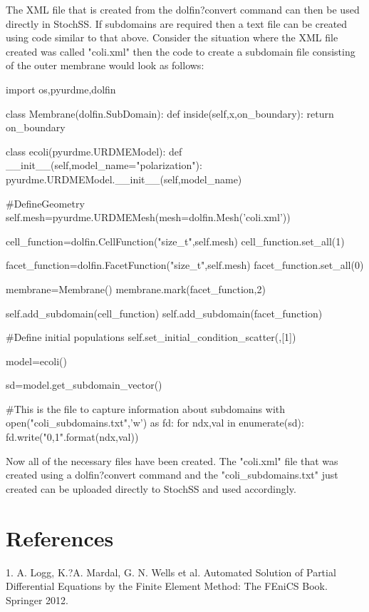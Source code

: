 The XML file that is created from the dolfin?convert command can then be used directly in StochSS. If subdomains are
required then a text file can be created using code similar to that above. Consider the situation where the XML file created
was called "coli.xml" then the code to create a subdomain file consisting of the outer membrane would look as follows:

\begin{ipythonnb}
import os,pyurdme,dolfin
\end{ipythonnb}

\begin{ipythonnb}
class Membrane(dolfin.SubDomain):
	def inside(self,x,on_boundary):
	return on_boundary
\end{ipythonnb}

\begin{ipythonnb}
class ecoli(pyurdme.URDMEModel):
	def __init__(self,model_name="polarization"):
		pyurdme.URDMEModel.__init__(self,model_name)
		
		#DefineGeometry
		self.mesh=pyurdme.URDMEMesh(mesh=dolfin.Mesh('coli.xml'))

		cell_function=dolfin.CellFunction("size_t",self.mesh)
		cell_function.set_all(1)

		facet_function=dolfin.FacetFunction("size_t",self.mesh)
		facet_function.set_all(0)

		membrane=Membrane()
		membrane.mark(facet_function,2)

		self.add_subdomain(cell_function)
		self.add_subdomain(facet_function)

		#Define initial populations
		self.set_initial_condition_scatter({},[1])
\end{ipythonnb}

\begin{ipythonnb}
model=ecoli()
\end{ipythonnb}

\begin{ipythonnb}
sd=model.get_subdomain_vector()
\end{ipythonnb}

\begin{ipythonnb}
\#This is the file to capture information about subdomains
with open("coli_subdomains.txt",'w') as fd:
	for ndx,val in enumerate(sd):
		fd.write("{0},{1}\n".format(ndx,val))
\end{ipythonnb}

Now all of the necessary files have been created. The "coli.xml" file that was created using a dolfin?convert command and
the "coli\_subdomains.txt" just created can be uploaded directly to StochSS and used accordingly.

\section{References}

1. A. Logg, K.?A. Mardal, G. N. Wells et al. Automated Solution of Partial Differential Equations by the Finite Element Method: The FEniCS Book. Springer 2012.

